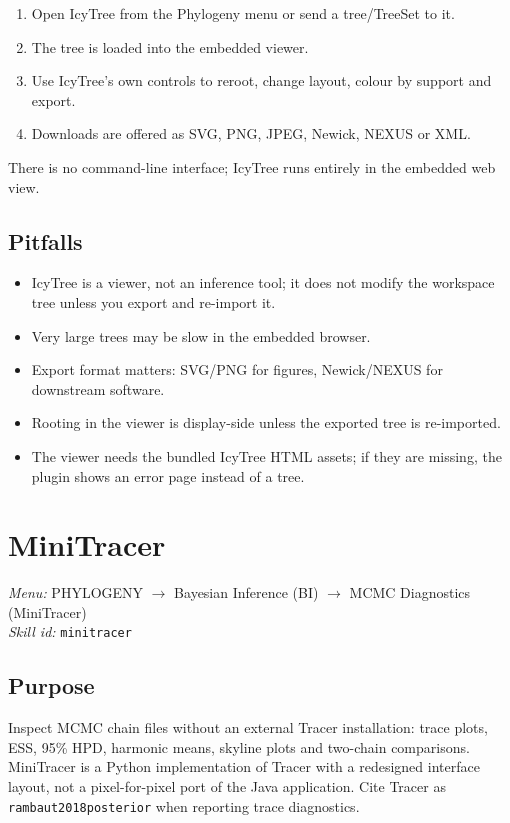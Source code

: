 \documentclass[11pt]{report}
\begin{document}
\begin{enumerate}
  \item Open IcyTree from the Phylogeny menu or send a tree/TreeSet to it.
  \item The tree is loaded into the embedded viewer.
  \item Use IcyTree's own controls to reroot, change layout, colour by support and export.
  \item Downloads are offered as SVG, PNG, JPEG, Newick, NEXUS or XML.
\end{enumerate}

There is no command-line interface; IcyTree runs entirely in the embedded web view.

\subsection{Pitfalls}

\begin{itemize}
  \item IcyTree is a viewer, not an inference tool; it does not modify the workspace tree unless you export and re-import it.
  \item Very large trees may be slow in the embedded browser.
  \item Export format matters: SVG/PNG for figures, Newick/NEXUS for downstream software.
  \item Rooting in the viewer is display-side unless the exported tree is re-imported.
  \item The viewer needs the bundled IcyTree HTML assets; if they are missing, the plugin shows an error page instead of a tree.
\end{itemize}


\section{MiniTracer}
\noindent\textit{Menu:} PHYLOGENY $\rightarrow$ Bayesian Inference (BI) $\rightarrow$ MCMC Diagnostics (MiniTracer)\\
\noindent\textit{Skill id:} \texttt{minitracer}

\subsection{Purpose}

Inspect MCMC chain files without an external Tracer installation: trace plots, ESS, 95\% HPD, harmonic means, skyline plots and two-chain comparisons. MiniTracer is a Python implementation of Tracer with a redesigned interface layout, not a pixel-for-pixel port of the Java application. Cite Tracer as \texttt{rambaut2018posterior} when reporting trace diagnostics.
\end{document}
